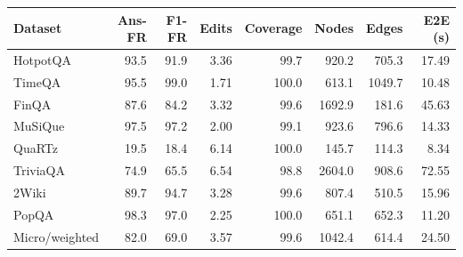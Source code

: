 \begin{tabular}{lrrrrrrr}
\toprule
Dataset & Ans-FR & F1-FR & Edits & Coverage & Nodes & Edges & E2E (s) \\
\midrule
HotpotQA & 93.5 & 91.9 & 3.36 & 99.7 & 920.2 & 705.3 & 17.49 \\
TimeQA & 95.5 & 99.0 & 1.71 & 100.0 & 613.1 & 1049.7 & 10.48 \\
FinQA & 87.6 & 84.2 & 3.32 & 99.6 & 1692.9 & 181.6 & 45.63 \\
MuSiQue & 97.5 & 97.2 & 2.00 & 99.1 & 923.6 & 796.6 & 14.33 \\
QuaRTz & 19.5 & 18.4 & 6.14 & 100.0 & 145.7 & 114.3 & 8.34 \\
TriviaQA & 74.9 & 65.5 & 6.54 & 98.8 & 2604.0 & 908.6 & 72.55 \\
2Wiki & 89.7 & 94.7 & 3.28 & 99.6 & 807.4 & 510.5 & 15.96 \\
PopQA & 98.3 & 97.0 & 2.25 & 100.0 & 651.1 & 652.3 & 11.20 \\
\midrule
Micro/weighted & 82.0 & 69.0 & 3.57 & 99.6 & 1042.4 & 614.4 & 24.50 \\
\bottomrule
\end{tabular}
